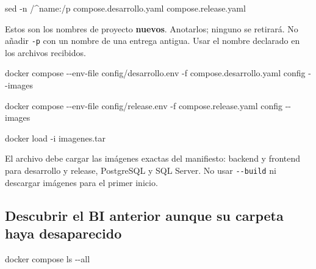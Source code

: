 \documentclass[
  spanish,
  10pt,
  a4paper,
]{article}
\newenvironment{Shaded}{}{}
\newcommand{\AttributeTok}[1]{#1}
\newcommand{\ExtensionTok}[1]{#1}
\newcommand{\FunctionTok}[1]{#1}
\newcommand{\NormalTok}[1]{#1}
\newcommand{\StringTok}[1]{#1}
\renewenvironment{Shaded}{\begin{snugshade}}{\end{snugshade}}%
\begin{document}
\begin{Shaded}
\begin{Highlighting}[]
\FunctionTok{sed} \AttributeTok{{-}n} \StringTok{\textquotesingle{}/\^{}name:/p\textquotesingle{}}\NormalTok{ compose.desarrollo.yaml compose.release.yaml}
\end{Highlighting}
\end{Shaded}

Estos son los nombres de proyecto \textbf{nuevos}. Anotarlos; ninguno se
retirará. No añadir \texttt{-p} con un nombre de una entrega antigua.
Usar el nombre declarado en los archivos recibidos.

\begin{Shaded}
\begin{Highlighting}[]
\ExtensionTok{docker}\NormalTok{ compose }\AttributeTok{{-}{-}env{-}file}\NormalTok{ config/desarrollo.env }\AttributeTok{{-}f}\NormalTok{ compose.desarrollo.yaml config }\AttributeTok{{-}{-}images}
\end{Highlighting}
\end{Shaded}

\begin{Shaded}
\begin{Highlighting}[]
\ExtensionTok{docker}\NormalTok{ compose }\AttributeTok{{-}{-}env{-}file}\NormalTok{ config/release.env }\AttributeTok{{-}f}\NormalTok{ compose.release.yaml config }\AttributeTok{{-}{-}images}
\end{Highlighting}
\end{Shaded}

\begin{Shaded}
\begin{Highlighting}[]
\ExtensionTok{docker}\NormalTok{ load }\AttributeTok{{-}i}\NormalTok{ imagenes.tar}
\end{Highlighting}
\end{Shaded}

El archivo debe cargar las imágenes exactas del manifiesto: backend y
frontend para desarrollo y release, PostgreSQL y SQL Server. No usar
\texttt{-\/-build} ni descargar imágenes para el primer inicio.

\subsection{Descubrir el BI anterior aunque su carpeta haya
desaparecido}\label{descubrir-el-bi-anterior-aunque-su-carpeta-haya-desaparecido}

\begin{Shaded}
\begin{Highlighting}[]
\ExtensionTok{docker}\NormalTok{ compose ls }\AttributeTok{{-}{-}all}
\end{Highlighting}
\end{Shaded}
\end{document}
